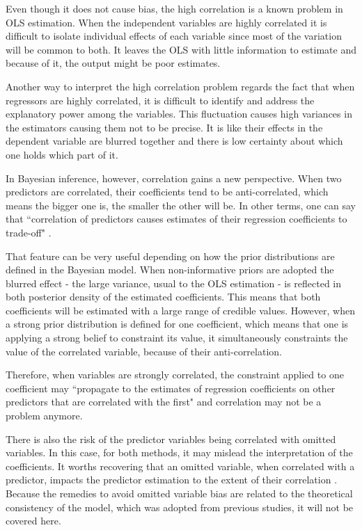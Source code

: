 Even though it does not cause bias, the high correlation is a known problem in OLS estimation. When the independent variables are highly correlated it is difficult to isolate individual effects of each variable since most of the variation will be common to both. It leaves the OLS with little information to estimate and because of it, the output might be poor estimates. 

Another way to interpret the high correlation problem regards the fact that when regressors are highly correlated, it is difficult to identify and address the explanatory power among the variables. This fluctuation causes high variances in the estimators causing them not to be precise. It is like their effects in the dependent variable are blurred together and there is low certainty about which one holds which part of it.

In Bayesian inference, however, correlation gains a new perspective. When two predictors are correlated, their coefficients tend to be anti-correlated, which means the bigger one is, the smaller the other will be. In other terms, one can say that ``correlation of predictors causes estimates of their regression coefficients to trade-off" \citep[p.~513]{kruschke2014}. 

That feature can be very useful depending on how the prior distributions are defined in the Bayesian model. When non-informative priors are adopted the blurred effect - the large variance, usual to the OLS  estimation - is reflected in both posterior density of the estimated coefficients. This means that both coefficients will be estimated with a large range of credible values. However, when a strong prior distribution is defined for one coefficient, which means that one is applying a strong belief to constraint its value, it simultaneously constraints the value of the correlated variable, because of their anti-correlation. 

Therefore, when variables are strongly correlated, the constraint applied to one coefficient may ``propagate to the estimates of regression coefficients on other predictors that are correlated with the first" \citep[p.~525]{kruschke2014} and correlation may not be a problem anymore.

There is also the risk of the predictor variables being correlated with omitted variables. In this case, for both methods, it may mislead the interpretation of the coefficients. It worths recovering that an omitted variable, when correlated with a predictor, impacts the predictor estimation to the extent of their correlation \citep{studenmund2011}. Because the remedies to avoid omitted variable bias are related to the theoretical consistency of the model, which was adopted from previous studies, it will not be covered here. 

